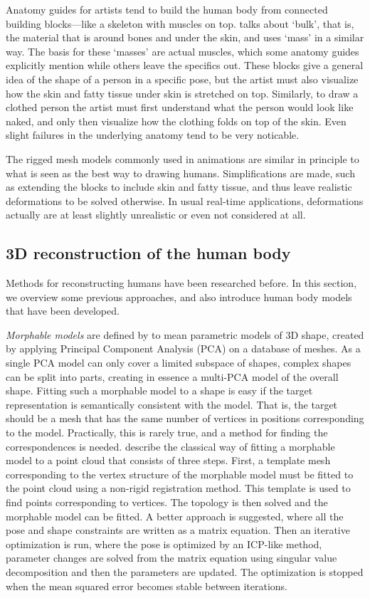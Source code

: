 Anatomy guides for artists tend to build the human body from connected building blocks---like a skeleton with muscles on top. \citet{loomis1943figure} talks about `bulk', that is, the material that is around bones and under the skin, and \citet{hogarth2003} uses `mass' in a similar way. The basis for these `masses' are actual muscles, which some anatomy guides explicitly mention \citep{hogarth2003} while others leave the specifics out. These blocks give a general idea of the shape of a person in a specific pose, but the artist must also visualize how the skin and fatty tissue under skin is stretched on top. Similarly, to draw a clothed person the artist must first understand what the person would look like naked, and only then visualize how the clothing folds on top of the skin. Even slight failures in the underlying anatomy tend to be very noticable. \citep{ediciones2004}

The rigged mesh models commonly used in animations are similar in principle to what is seen as the best way to drawing humans. Simplifications are made, such as extending the blocks to include skin and fatty tissue, and thus leave realistic deformations to be solved otherwise. In usual real-time applications, deformations actually are at least slightly unrealistic or even not considered at all.


\subsection{3D reconstruction of the human body}

Methods for reconstructing humans have been researched before. In this section, we overview some previous approaches, and also introduce human body models that have been developed.

\textit{Morphable models} are defined by \citet{schneider2010fitting} to mean parametric models of 3D shape, created by applying Principal Component Analysis (PCA) on a database of meshes. As a single PCA model can only cover a limited subspace of shapes, complex shapes can be split into parts, creating in essence a multi-PCA model of the overall shape. Fitting such a morphable model to a shape is easy if the target representation is semantically consistent with the model. That is, the target should be a mesh that has the same number of vertices in positions corresponding to the model. Practically, this is rarely true, and a method for finding the correspondences is needed. \citet{schneider2010fitting} describe the classical way of fitting a morphable model to a point cloud that consists of three steps. First, a template mesh corresponding to the vertex structure of the morphable model must be fitted to the point cloud using a non-rigid registration method. This template is used to find points corresponding to vertices. The topology is then solved and the morphable model can be fitted. A better approach is suggested, where all the pose and shape constraints are written as a matrix equation. Then an iterative optimization is run, where the pose is optimized by an ICP-like method, parameter changes are solved from the matrix equation using singular value decomposition and then the parameters are updated. The optimization is stopped when the mean squared error becomes stable between iterations.

